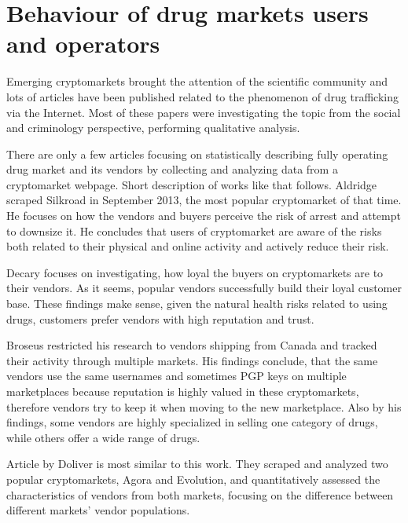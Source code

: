 \documentclass[
  digital, %
  table,   %
  lof,     %
  lot,     %
  oneside
]{fithesis3}
\begin{document}
\section{Behaviour of drug markets users and operators}

Emerging cryptomarkets brought the attention of the scientific community
and lots of articles have been published related to the phenomenon of drug trafficking via the Internet.
Most of these papers were investigating the topic from the social
and criminology perspective, performing qualitative analysis.
\parencite{aldridge2014not}
\parencite{barratt2014use}
\parencite{christin2013traveling}
\parencite{dolliver2015criminogenic}
\parencite{van2013silk}
\parencite{walsh2011drugs}
\parencite{martin2014lost}

There are only a few articles focusing on statistically describing fully operating drug market and its vendors
by collecting and analyzing data from a cryptomarket webpage. Short description of works like that follows.
Aldridge \parencite{aldridge2017delivery} scraped Silkroad in September 2013, the most popular cryptomarket of that time.
He focuses on how the vendors and buyers perceive the risk of arrest and attempt to downsize it.
He concludes that users of cryptomarket are aware of the risks both related to their physical and online activity
and actively reduce their risk.

Decary \parencite{decary2017repeat} focuses on investigating, how loyal the buyers on cryptomarkets are to their vendors. As it seems, popular vendors successfully build their loyal customer base. These findings make sense, given the natural health risks related to using drugs,
customers prefer vendors with high reputation and trust.

Broseus \parencite{broseus2016studying} restricted his research to vendors shipping from Canada
and tracked their activity through multiple markets. His findings conclude, that the same vendors
use the same usernames and sometimes PGP keys on multiple marketplaces because reputation
is highly valued in these cryptomarkets, therefore vendors try to keep it when moving to the new marketplace.
Also by his findings, some vendors are highly specialized in selling one category of drugs, while others offer a wide range of drugs.

Article by Doliver \parencite{dolliver2016characteristics} is most similar to this work.
They scraped and analyzed two popular cryptomarkets, Agora and Evolution, and quantitatively assessed
the characteristics of vendors from both markets, focusing on the difference
 between different markets' vendor populations.
\end{document}
